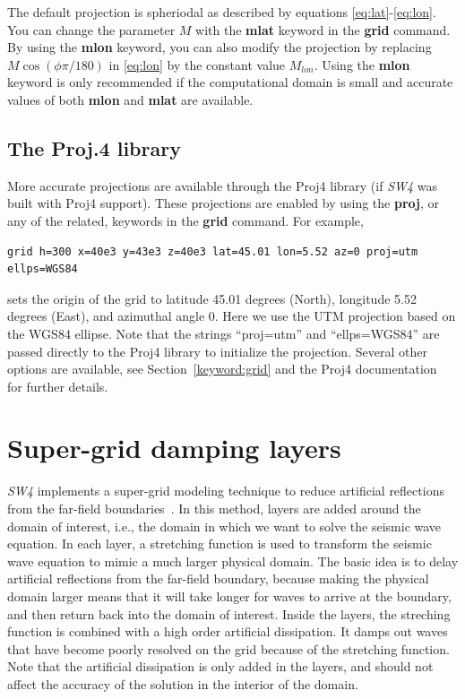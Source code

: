 \documentclass[11pt]{report}
\begin{document}
The default projection is spheriodal as described by equations \eqref{eq:lat}-\eqref{eq:lon}. You
can change the parameter $M$ with the {\bf mlat} keyword in the {\bf grid} command. By using the
{\bf mlon} keyword, you can also modify the projection by replacing $M\cos(\phi\pi/180)$ in
\eqref{eq:lon} by the constant value $M_{lon}$. Using the {\bf mlon} keyword is only recommended if
the computational domain is small and accurate values of both {\bf mlon} and {\bf mlat} are
available.

\subsection{The Proj.4 library}
More accurate projections are available through the Proj4 library (if
\emph{SW4} was built with Proj4 support). These projections are enabled by using the {\bf proj},
or any of the related, keywords in the {\bf grid} command. For example,
\begin{verbatim}
grid h=300 x=40e3 y=43e3 z=40e3 lat=45.01 lon=5.52 az=0 proj=utm ellps=WGS84
\end{verbatim}
sets the origin of the grid to latitude 45.01 degrees (North), longitude 5.52 degrees (East), and
azimuthal angle 0. Here we use the UTM projection based on the WGS84 ellipse. Note that the strings
``proj=utm'' and ``ellps=WGS84'' are passed directly to the Proj4 library to initialize the
projection. Several other options are available, see Section~\ref{keyword:grid} and the Proj4
documentation~\cite{Proj4} for further details.

\section{Super-grid damping layers}\label{sec:supergrid}

\emph{SW4} implements a super-grid modeling technique to reduce artificial reflections from the
far-field boundaries~\cite{AppCol-09, PetSjo-14}. In this method, layers are added around the domain
of interest, i.e., the domain in which we want to solve the seismic wave equation. In each layer, a
stretching function is used to transform the seismic wave equation to mimic a much larger physical
domain. The basic idea is to delay artificial reflections from the far-field boundary, because
making the physical domain larger means that it will take longer for waves to arrive at the
boundary, and then return back into the domain of interest. Inside the layers, the streching
function is combined with a high order artificial dissipation. It damps out waves that have become
poorly resolved on the grid because of the stretching function. Note that the artificial dissipation
is only added in the layers, and should not affect the accuracy of the solution in the interior of
the domain.
\end{document}
